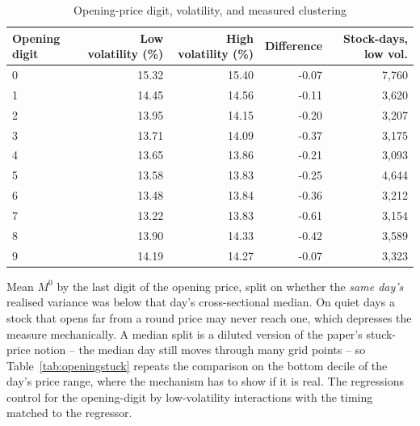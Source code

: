 \begin{table}[htbp]
\centering
\caption{Opening-price digit, volatility, and measured clustering}
\label{tab:opening}
\small
\begin{threeparttable}
\begin{tabular}{@{}lrrrr@{}}
\toprule
Opening digit & Low volatility (\%) & High volatility (\%) & Difference & Stock-days, low vol. \\
\midrule
0 & 15.32 & 15.40 & -0.07 & 7,760 \\
1 & 14.45 & 14.56 & -0.11 & 3,620 \\
2 & 13.95 & 14.15 & -0.20 & 3,207 \\
3 & 13.71 & 14.09 & -0.37 & 3,175 \\
4 & 13.65 & 13.86 & -0.21 & 3,093 \\
5 & 13.58 & 13.83 & -0.25 & 4,644 \\
6 & 13.48 & 13.84 & -0.36 & 3,212 \\
7 & 13.22 & 13.83 & -0.61 & 3,154 \\
8 & 13.90 & 14.33 & -0.42 & 3,589 \\
9 & 14.19 & 14.27 & -0.07 & 3,323 \\
\bottomrule
\end{tabular}
\begin{tablenotes}[flushleft]\footnotesize
\item Mean $M^{0}$ by the last digit of the opening price, split on whether the \emph{same day's} realised variance was below that day's cross-sectional median. On quiet days a stock that opens far from a round price may never reach one, which depresses the measure mechanically. A median split is a diluted version of the paper's stuck-price notion -- the median day still moves through many grid points -- so Table~\ref{tab:openingstuck} repeats the comparison on the bottom decile of the day's price range, where the mechanism has to show if it is real. The regressions control for the opening-digit by low-volatility interactions with the timing matched to the regressor.
\end{tablenotes}
\end{threeparttable}
\end{table}
